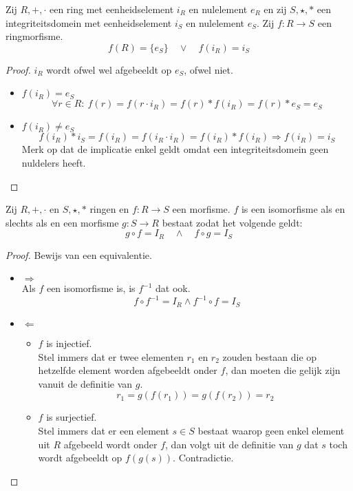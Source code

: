 \documentclass[main.tex]{subfiles}
\begin{document}
\begin{pr}
  Zij $R,+,\cdot$ een ring met eenheidselement $i_{R}$ en nulelement $e_{R}$ en zij $S,\star,*$ een integriteitsdomein met eenheidselement $i_{S}$ en nulelement $e_{S}$.
  Zij $f: R \rightarrow S$ een ringmorfisme.
  \[ f(R) = \{e_{S}\} \quad\vee\quad f(i_{R}) = i_{S} \]
  
  \begin{proof}
    $i_{R}$ wordt ofwel wel afgebeeldt op $e_{S}$, ofwel niet.
    \begin{itemize}
    \item $f(i_{R}) = e_{S}$\\
      \[ \forall r \in R:\ f(r) = f(r\cdot i_{R}) = f(r) * f(i_{R}) = f(r) * e_{S} = e_{S} \]
    \item $f(i_{R}) \neq e_{S}$\\
      \[ f(i_{R}) * i_{S} = f(i_{R}) = f(i_{R} \cdot i_{R}) = f(i_{R}) * f(i_{R}) \Rightarrow f(i_{R}) = i_{S} \]
      Merk op dat de implicatie enkel geldt omdat een integriteitsdomein geen nuldelers heeft.
    \end{itemize}
  \end{proof}
\end{pr}

\begin{pr}
  Zij $R,+,\cdot$ en $S,\star,*$ ringen en $f: R \rightarrow S$ een morfisme.
  $f$ is een isomorfisme als en slechts als en een morfisme $g: S \rightarrow R$ bestaat zodat het volgende geldt:
  \[ g \circ f = I_{R} \quad\wedge\quad f \circ g = I_{S} \]

  \begin{proof}
    Bewijs van een equivalentie.\\
    \begin{itemize}
    \item $\Rightarrow$\\
      Als $f$ een isomorfisme is, is $f^{-1}$ dat ook.
      \[ f \circ f^{-1} = I_{R} \wedge f^{-1} \circ f = I_{S} \]
    \item $\Leftarrow$\\
      \begin{itemize}
      \item $f$ is injectief.\\
        Stel immers dat er twee elementen $r_{1}$ en $r_{2}$ zouden bestaan die op hetzelfde element worden afgebeeldt onder $f$, dan moeten die gelijk zijn vanuit de definitie van $g$.
        \[ r_{1} = g(f(r_{1})) = g(f(r_{2})) = r_{2} \]
      \item $f$ is surjectief.\\
        Stel immers dat er een element $s\in S$ bestaat waarop geen enkel element uit $R$ afgebeeld wordt onder $f$, dan volgt uit de definitie van $g$ dat $s$ toch wordt afgebeeldt op $f(g(s))$.
        Contradictie.
      \end{itemize}
    \end{itemize}
  \end{proof}
\end{pr}
\end{document}
